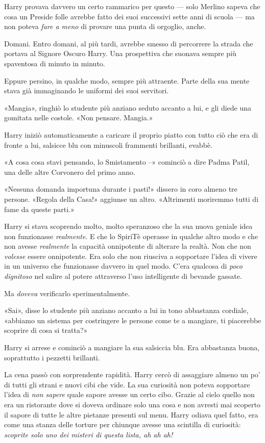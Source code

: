 Harry provava davvero un certo rammarico per questo — solo Merlino sapeva che cosa un Preside folle avrebbe fatto dei suoi successivi sette anni di scuola — ma non poteva \textit{fare a meno} di provare una punta di orgoglio, anche.

Domani. Entro domani, al più tardi, avrebbe smesso di percorrere la strada che portava al Signore Oscuro Harry. Una prospettiva che suonava sempre più spaventosa di minuto in minuto.

Eppure persino, in qualche modo, sempre più attraente. Parte della sua mente stava già immaginando le uniformi dei suoi servitori.

«Mangia», ringhiò lo studente più anziano seduto accanto a lui, e gli diede una gomitata nelle costole. «Non pensare. Mangia.»

Harry iniziò automaticamente a caricare il proprio piatto con tutto ciò che era di fronte a lui, salsicce blu con minuscoli frammenti brillanti, evabbè.

«A cosa cosa stavi pensando, lo Smistamento –» cominciò a dire Padma Patil, una delle altre Corvonero del primo anno.

«Nessuna domanda importuna durante i pasti!» dissero in coro almeno tre persone. «Regola della Casa!» aggiunse un altro. «Altrimenti moriremmo tutti di fame da queste parti.»

Harry si stava scoprendo molto, molto speranzoso che la sua nuova geniale idea non funzionasse \textit{realmente}. E che lo SpiriTè operasse in qualche altro modo e che non avesse \textit{realmente} la capacità onnipotente di alterare la realtà. Non che non \textit{volesse} essere onnipotente. Era solo che non riusciva a sopportare l’idea di vivere in un universo che funzionasse davvero in quel modo. C’era qualcosa di \textit{poco dignitoso} nel salire al potere attraverso l’uso intelligente di bevande gassate.

Ma \textit{doveva} verificarlo sperimentalmente.

«Sai», disse lo studente più anziano accanto a lui in tono abbastanza cordiale, «abbiamo un sistema per costringere le persone come te a mangiare, ti piacerebbe scoprire di cosa si tratta?»

Harry si arrese e cominciò a mangiare la sua salsiccia blu. Era abbastanza buona, soprattutto i pezzetti brillanti.

La cena passò con sorprendente rapidità. Harry cercò di assaggiare almeno un po’ di tutti gli strani e nuovi cibi che vide. La sua curiosità non poteva sopportare l’idea di \textit{non sapere} quale sapore avesse un certo cibo. Grazie al cielo quello non era un ristorante dove si doveva ordinare solo una cosa e non avresti mai scoperto il sapore di tutte le altre pietanze presenti sul menu. Harry odiava quel fatto, era come una stanza delle torture per chiunque avesse una scintilla di curiosità: \textit{scoprite solo uno dei misteri di questa lista, ah ah ah!}

